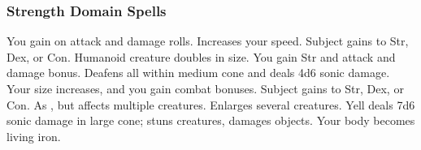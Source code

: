 \subsubsection{Strength Domain Spells}

\begin{spelllist}
     You gain  on attack and damage rolls.
     Increases your speed.
     Subject gains  to Str, Dex, or Con.
    \spellhead[2]{}
     Humanoid creature doubles in size.
    \spellhead[3]{}
     You gain  Str and attack and damage bonus.
     Deafens all within medium cone and deals 4d6 sonic damage.
     Your size increases, and you gain combat bonuses.
     Subject gains  to Str, Dex, or Con.
     As , but affects multiple creatures.
    \spellhead[6]{}
     Enlarges several creatures.
     Yell deals 7d6 sonic damage in large cone; stuns creatures, damages objects.
     Your body becomes living iron.
    \spellhead[8]{}
    \spellhead[9]{}
    \spellhead[9]{} 
\end{spelllist}

\begin{comment}
\subsubsection{Sun Domain Spells}

\begin{spelllist}
    \spellhead[1]{Daylight} Large radius of bright light.
    \spellhead[2]{Flaming Sphere} Creates rolling ball of fire, 2d6 damage, lasts short duration.
    \spellhead[2]{Blindness/Deafness \fn{1}}
    \spellhead[3]{Plant Growth}
    \spellhead[3]{Searing Light} Ray deals 1d8/ two levels, more against undead.
    \spellhead[4]{Death Ward} Grants immunity to death spells and negative energy effects.
    \spellhead[4]{Disrupting Weapon} Melee weapon destroys undead.
    \spellhead[5]{Wall of Fire} Passing through wall deals 5d6 damage
    \spellhead[5]{Flame Strike} Smite foes with divine fire for 5d6 damage.
    \spellhead[6]{Fire Seeds} Acorns and berries become grenades and bombs.
    \spellhead[6]{Sunbeam} Multiple beams blind and deal 5d6 damage in large line.
    \spellhead[7]{Prismatic Spray} Rays hit subjects with variety of effects.
    \spellhead[7]{Sunburst} Blinds all within large radius, deals 10d6 damage.
    \spellhead[8]{Fire Storm} Deals 8d6 fire damage to enemies in large spread.
    \spellhead[8]{Prismatic Wall} Wall's colors have array of effects.
    \spellhead[9]{Meteor Swarm} Massive hail of meteors deals 9d8 damage.
    \spellhead[9]{Prismatic Sphere} As prismatic wall, but surrounds on all sides.
\end{spelllist}
1. Blindness only
\end{comment}


